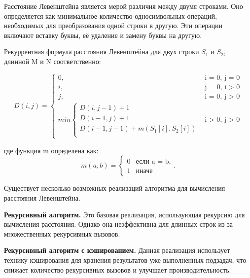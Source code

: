 \documentclass[a4paper, 14pt]{extreport}
\begin{document}
    Расстояние Левенштейна является мерой различия между двумя строками.
    Оно определяется как минимальное количество односимвольных операций, необходимых для преобразования одной строки в другую.
    Эти операции включают вставку буквы, её удаление и замену буквы на другую.

    Рекуррентная формула расстояния Левенштейна для двух строки $S_{1}$ и $S_{2}$, длинной M и N соответственно:

    \begin{equation}
        \label{eq:L}
        D(i, j) = \begin{cases}
                      0, &\text{i = 0, j = 0}\\
                      i, &\text{j = 0, i > 0}\\
                      j, &\text{i = 0, j > 0}\\
                      min \begin{cases}
                              D(i, j - 1) + 1\\
                              D(i - 1, j) + 1\\
                              D(i - 1, j - 1) + m(S_{1}[i], S_{2}[i]) \\
                      \end{cases}
                      &\text{i > 0, j > 0}
        \end{cases}
    \end{equation}

    \vspace{5mm}

    где функция m определена как:
    \begin{equation}
        \label{eq:m}
        m(a, b) = \begin{cases}
                      0 &\text{если a = b,}\\
                      1 &\text{иначе}
        \end{cases}.
    \end{equation}

    Существует несколько возможных реализаций алгоритма для вычисления расстояния Левенштейна.

    \textbf{Рекурсивный алгоритм.} Это базовая реализация, использующая рекурсию для вычисления расстояния.
    Однако она неэффективна для длинных строк из-за множественных рекурсивных вызовов.

    \textbf{Рекурсивный алгоритм с кэшированием.} Данная реализация использует технику кэширования для хранения результатов уже выполненных подзадач, что снижает количество рекурсивных вызовов и улучшает производительность.
\end{document}
